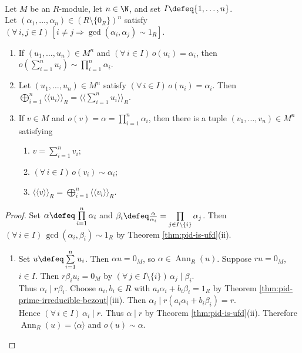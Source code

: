 \begin{theorem} \label{thm:cyclic-composition-coprime-orders} \\
Let $M$ be an $R$-module, let $n\in\N$, and set $I\defeq\{1,\ldots,n\}$.\\
Let $(\alpha_1,\ldots,\alpha_n)\in(R\setminus\{0_R\})^n$ satisfy $(\forall\,i,j\in I)\,[i\neq j\Rightarrow\gcd(\alpha_i,\alpha_j)\sim1_R]$.
\begin{enumerate}[label=(\roman*)]
\setlength{\itemsep}{0pt}
\item If $(u_1,\ldots,u_n)\in M^n$ and $(\forall\,i\in I)\,o(u_i)=\alpha_i$, then $o(\sum\limits_{i=1}^{n}u_i)\sim\prod\limits_{i=1}^{n}\alpha_i$.
\item Let $(u_1,\ldots,u_n)\in M^n$ satisfy $(\forall\,i\in I)\,o(u_i)=\alpha_i$. Then $\bigoplus\limits_{i=1}^{n}\langle\!\langle u_i\rangle\!\rangle_R=\langle\!\langle\sum\limits_{i=1}^{n}u_i\rangle\!\rangle_R$.
\item If $v\in M$ and $o(v)=\alpha=\prod\limits_{i=1}^{n}\alpha_i$, then there is a tuple $(v_1,\ldots,v_n)\in M^n$ satisfying
\begin{enumerate}[label=(\alph*)]
\setlength{\itemsep}{0pt}
\item $v=\sum\limits_{i=1}^{n}v_i$;
\item $(\forall\,i\in I)\,o(v_i)\sim\alpha_i$;
\item $\langle\!\langle v\rangle\!\rangle_R=\bigoplus\limits_{i=1}^{n}\langle\!\langle v_i\rangle\!\rangle_R$.
\end{enumerate}
\end{enumerate}
\begin{proof}
Set $\alpha\defeq\prod\limits_{i=1}^{n}\alpha_i$ and $\beta_i\defeq\frac{\alpha}{\alpha_i}=\prod\limits_{j\in I\setminus\{i\}}\alpha_j$. Then $(\forall\,i\in I)\,\gcd(\alpha_i,\beta_i)\sim1_R$ by Theorem \ref{thm:pid-is-ufd}(ii).
\begin{enumerate}[label=(\roman*)]
\setlength{\itemsep}{0pt}
\item Set $u\defeq\sum\limits_{i=1}^{n}u_i$. Then $\alpha u=0_M$, so $\alpha\in\operatorname{Ann}_R(u)$. Suppose $ru=0_M$, $i\in I$. Then $r\beta_i u_i=0_M$ by $(\forall\,j\in I\setminus\{i\})\,\alpha_j\mid\beta_i$.\\
Thus $\alpha_i\mid r\beta_i$. Choose $a_i,b_i\in R$ with $a_i\alpha_i+b_i\beta_i=1_R$ by Theorem \ref{thm:pid-prime-irreducible-bezout}(iii). Then $\alpha_i\mid r(a_i\alpha_i+b_i\beta_i)=r$.\\
Hence $(\forall\,i\in I)\,\alpha_i\mid r$. Thus $\alpha\mid r$ by Theorem \ref{thm:pid-is-ufd}(ii). Therefore $\operatorname{Ann}_R(u)=\langle\alpha\rangle$ and $o(u)\sim\alpha$.

\end{enumerate}
\end{proof}
\end{theorem}
